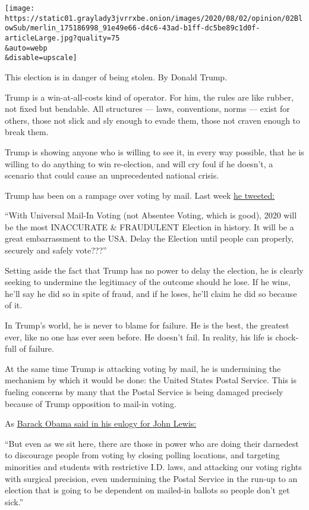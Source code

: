 \texttt{[image: https://static01.graylady3jvrrxbe.onion/images/2020/08/02/opinion/02BlowSub/merlin\_175186998\_91e49e66-d4c6-43ad-b1ff-dc5be89c1d0f-articleLarge.jpg?quality=75\\\&auto=webp\\\&disable=upscale]}

This election is in danger of being stolen. By Donald Trump.

Trump is a win-at-all-costs kind of operator. For him, the rules are
like rubber, not fixed but bendable. All structures --- laws,
conventions, norms --- exist for others, those not slick and sly enough
to evade them, those not craven enough to break them.

Trump is showing anyone who is willing to see it, in every way possible,
that he is willing to do anything to win re-election, and will cry foul
if he doesn't, a scenario that could cause an unprecedented national
crisis.

Trump has been on a rampage over voting by mail. Last week
\href{https://twitter.com/realDonaldTrump/status/1288818160389558273}{he
tweeted:}

``With Universal Mail-In Voting (not Absentee Voting, which is good),
2020 will be the most INACCURATE \& FRAUDULENT Election in history. It
will be a great embarrassment to the USA. Delay the Election until
people can properly, securely and safely vote???''

Setting aside the fact that Trump has no power to delay the election, he
is clearly seeking to undermine the legitimacy of the outcome should he
lose. If he wins, he'll say he did so in spite of fraud, and if he
loses, he'll claim he did so because of it.

In Trump's world, he is never to blame for failure. He is the best, the
greatest ever, like no one has ever seen before. He doesn't fail. In
reality, his life is chock-full of failure.

At the same time Trump is attacking voting by mail, he is undermining
the mechanism by which it would be done: the United States Postal
Service. This is fueling concerns by many that the Postal Service is
being damaged precisely because of Trump opposition to mail-in voting.

As
\href{https://www.cnbc.com/2020/07/30/obama-expand-voting-rights-to-honor-late-civil-rights-icon-john-lewis.html}{Barack
Obama said in his eulogy for John Lewis:}

``But even as we sit here, there are those in power who are doing their
darnedest to discourage people from voting by closing polling locations,
and targeting minorities and students with restrictive I.D. laws, and
attacking our voting rights with surgical precision, even undermining
the Postal Service in the run-up to an election that is going to be
dependent on mailed-in ballots so people don't get sick.''

